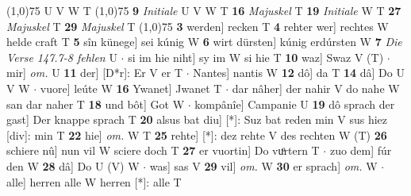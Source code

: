 \documentclass[8pt,a4paper,notitlepage]{article}
\begin{document}
\begin{table}[ht]
\begin{minipage}[t]{0.5\linewidth}
\begin{tabular}{rl}
\end{tabular}
\scriptsize
\line(1,0){75} \newline
U V W T \newline
\line(1,0){75} \newline
\textbf{9} \textit{Initiale} U V W T  \textbf{16} \textit{Majuskel} T  \textbf{19} \textit{Initiale} W T  \textbf{27} \textit{Majuskel} T  \textbf{29} \textit{Majuskel} T  \newline
\line(1,0){75} \newline
\textbf{3} werden] recken T \textbf{4} rehter wer] rechtes W helde craft T \textbf{5} sîn künege] sei kúnig W \textbf{6} wirt dürsten] kúnig erdúrsten W \textbf{7} \textit{Die Verse 147.7-8 fehlen} U   $\cdot$ si im hie niht] sy im W si hie T \textbf{10} waz] Swaz V (T)  $\cdot$ mir] \textit{om.} U \textbf{11} der] [D*r]: Er V er T  $\cdot$ Nantes] nantis W \textbf{12} dô] da T \textbf{14} dâ] Do U V W  $\cdot$ vuore] leúte W \textbf{16} Ywanet] Jwanet T  $\cdot$ dar nâher] der nahir V do nahe W san dar naher T \textbf{18} und bôt] Got W  $\cdot$ kompânîe] Campanie U \textbf{19} dô sprach der gast] Der knappe sprach T \textbf{20} alsus bat diu] [*]: Suz bat reden min V sus hiez [div]: min T \textbf{22} hie] \textit{om.} W T \textbf{25} rehte] [*]: dez rehte V des rechten W (T) \textbf{26} schiere nû] nun vil W sciere doch T \textbf{27} er vuortin] Do vuͦrtern T  $\cdot$ zuo dem] fúr den W \textbf{28} dâ] Do U (V) W  $\cdot$ was] sas V \textbf{29} vil] \textit{om.} W \textbf{30} er sprach] \textit{om.} W  $\cdot$ alle] herren alle W herren [*]: alle T \newline
\end{minipage}
\end{table}
\end{document}
